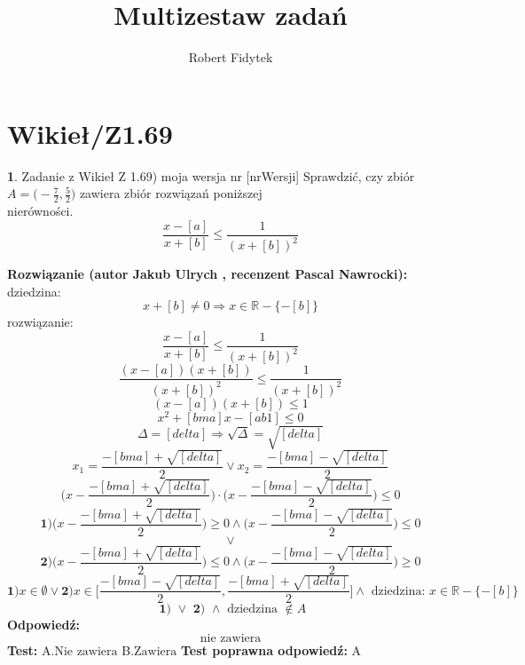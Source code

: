 \documentclass[12pt, a4paper]{article}
\title{Multizestaw zadań}
\author{Robert Fidytek}
\date{}
\theoremstyle{definition} %
\newtheorem{zad}{}
\newcommand{\kategoria}[1]{\section{#1}} %
\newcommand{\zadStart}[1]{\begin{zad}#1\newline} %
\newcommand{\zadStop}{\end{zad}}   %
\newcommand{\rozwStart}[2]{\noindent \textbf{Rozwiązanie (autor #1 , recenzent #2): }\newline} %
\newcommand{\rozwStop}{\newline}                                            %
\newcommand{\odpStart}{\noindent \textbf{Odpowiedź:}\newline}    %
\newcommand{\odpStop}{\newline}                                             %
\newcommand{\testStart}{\noindent \textbf{Test:}\newline} %
\newcommand{\testStop}{\newline} %
\newcommand{\kluczStart}{\noindent \textbf{Test poprawna odpowiedź:}\newline} %
\newcommand{\kluczStop}{\newline} %
\begin{document}
\maketitle


\kategoria{Wikieł/Z1.69}
\zadStart{Zadanie z Wikieł Z 1.69) moja wersja nr [nrWersji]}
Sprawdzić, czy zbiór $A=\big(-\frac{7}{2},\frac{5}{2}\big)$ zawiera zbiór rozwiązań poniższej\\ nierówności.
$$\frac{x-[a]}{x+[b]}\leq\frac{1}{(x+[b])^{2}}$$
\zadStop
\rozwStart{Jakub Ulrych}{Pascal Nawrocki}
dziedzina:$$x+[b]\neq0\Rightarrow x\in \mathbb{R}-\{-[b]\}$$
rozwiązanie:$$\frac{x-[a]}{x+[b]}\leq\frac{1}{(x+[b])^{2}}$$
$$\frac{(x-[a])(x+[b])}{(x+[b])^{2}}\leq\frac{1}{(x+[b])^{2}}$$
$$(x-[a])(x+[b])\leq1$$
$$x^{2}+[bma]x-[ab1]\leq0$$
$$\Delta=[delta]\Rightarrow \sqrt{\Delta}=\sqrt{[delta]}$$
$$x_{1}=\frac{-[bma]+\sqrt{[delta]}}{2} \vee x_{2}=\frac{-[bma]-\sqrt{[delta]}}{2}$$
$$\big(x-\frac{-[bma]+\sqrt{[delta]}}{2}\big)\cdot\big(x-\frac{-[bma]-\sqrt{[delta]}}{2}\big)\leq0$$
$$\textbf{1)}\big(x-\frac{-[bma]+\sqrt{[delta]}}{2}\big)\geq0 \land \big(x-\frac{-[bma]-\sqrt{[delta]}}{2}\big)\leq0$$ $$\vee$$ $$\textbf{2)}\big(x-\frac{-[bma]+\sqrt{[delta]}}{2}\big)\leq0 \land \big(x-\frac{-[bma]-\sqrt{[delta]}}{2}\big)\geq0$$
$$\textbf{1)}x\in\emptyset \vee \textbf{2)}x\in\bigg[\frac{-[bma]-\sqrt{[delta]}}{2},\frac{-[bma]+\sqrt{[delta]}}{2}\bigg]\land \text{ dziedzina: }x\in \mathbb{R}-\{-[b]\}$$
$$\textbf{ 1) }\vee\textbf{ 2) }\land\text{ dziedzina }\notin A$$
\rozwStop
\odpStart
$$\text{nie zawiera}$$
\odpStop
\testStart
A.$\text{Nie zawiera}$
B.$\text{Zawiera}$
\testStop
\kluczStart
A
\kluczStop
\end{document}
